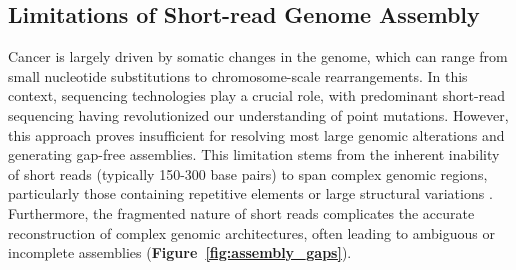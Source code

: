 \subsection{Limitations of Short-read Genome Assembly}

Cancer is largely driven by somatic changes in the genome, which can range from 
small nucleotide substitutions to chromosome-scale rearrangements. In this context, 
sequencing technologies play a crucial role, with predominant short-read sequencing 
having revolutionized our understanding of point mutations. However, this 
approach proves insufficient for resolving most large genomic alterations and 
generating gap-free assemblies. This limitation stems from the inherent 
inability of short reads (typically 150-300 base pairs) to span complex genomic 
regions, particularly those containing repetitive elements or large structural 
variations \cite{ho_structural_2020}. Furthermore, the fragmented nature of short 
reads complicates the accurate reconstruction of complex genomic architectures, 
often leading to ambiguous or incomplete assemblies 
(\textbf{Figure~\ref{fig:assembly_gaps}}).

